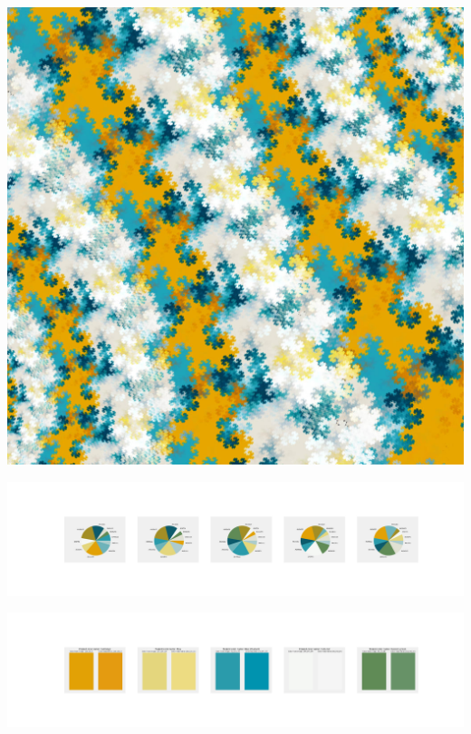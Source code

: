 \documentclass[11pt]{article}
\begin{document}
\begin{landscape}
    \begin{center}
    \includegraphics[width=\textwidth]{./nbimg/file (338).jpg}
    \end{center}

    \begin{center}
    \includegraphics[width=250mm]{./nbimg/pie-265.jpg}
    \end{center}

    \begin{center}
    \includegraphics[width=250mm]{./nbimg/peak-265.jpg}
    \end{center}
    


\end{landscape}
\end{document}
